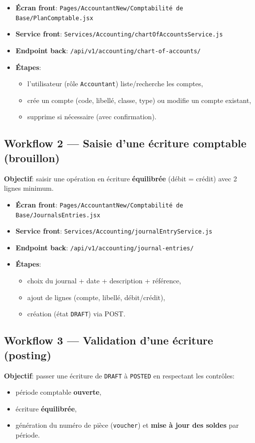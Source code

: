 \documentclass[12pt,a4paper]{article}
\begin{document}
\begin{itemize}[leftmargin=1.2cm]
  \item \textbf{Écran front}: \texttt{Pages/AccountantNew/Comptabilité de Base/PlanComptable.jsx}
  \item \textbf{Service front}: \texttt{Services/Accounting/chartOfAccountsService.js}
  \item \textbf{Endpoint back}: \texttt{/api/v1/accounting/chart-of-accounts/}
  \item \textbf{Étapes}:
  \begin{itemize}[leftmargin=1.2cm]
    \item l’utilisateur (rôle \texttt{Accountant}) liste/recherche les comptes,
    \item crée un compte (code, libellé, classe, type) ou modifie un compte existant,
    \item supprime si nécessaire (avec confirmation).
  \end{itemize}
\end{itemize}

\subsection{Workflow 2 --- Saisie d’une écriture comptable (brouillon)}
\textbf{Objectif}: saisir une opération en écriture \textbf{équilibrée} (débit = crédit) avec 2 lignes minimum.

\begin{itemize}[leftmargin=1.2cm]
  \item \textbf{Écran front}: \texttt{Pages/AccountantNew/Comptabilité de Base/JournalsEntries.jsx}
  \item \textbf{Service front}: \texttt{Services/Accounting/journalEntryService.js}
  \item \textbf{Endpoint back}: \texttt{/api/v1/accounting/journal-entries/}
  \item \textbf{Étapes}:
  \begin{itemize}[leftmargin=1.2cm]
    \item choix du journal + date + description + référence,
    \item ajout de lignes (compte, libellé, débit/crédit),
    \item création (état \texttt{DRAFT}) via POST.
  \end{itemize}
\end{itemize}

\subsection{Workflow 3 --- Validation d’une écriture (posting)}
\textbf{Objectif}: passer une écriture de \texttt{DRAFT} à \texttt{POSTED} en respectant les contrôles:
\begin{itemize}[leftmargin=1.2cm]
  \item période comptable \textbf{ouverte},
  \item écriture \textbf{équilibrée},
  \item génération du numéro de pièce (\texttt{voucher}) et \textbf{mise à jour des soldes} par période.
\end{itemize}
\end{document}

